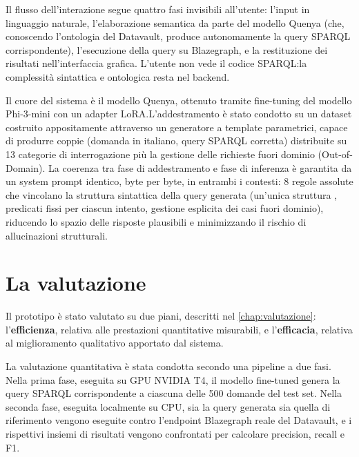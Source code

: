 Il flusso dell'interazione segue quattro fasi invisibili all'utente: l'input in linguaggio naturale, l'elaborazione semantica da parte del modello Quenya (che, conoscendo l'ontologia del Datavault, produce autonomamente la query SPARQL corrispondente), l'esecuzione della query su Blazegraph, e la restituzione dei risultati nell'interfaccia grafica. L'utente non vede il codice SPARQL:\@ la complessità sintattica e ontologica resta nel backend.

Il cuore del sistema è il modello Quenya, ottenuto tramite fine-tuning del modello Phi-3-mini con un adapter LoRA.\@ L'addestramento è stato condotto su un dataset costruito appositamente attraverso un generatore a template parametrici, capace di produrre coppie (domanda in italiano, query SPARQL corretta) distribuite su 13 categorie di interrogazione più la gestione delle richieste fuori dominio (Out-of-Domain). La coerenza tra fase di addestramento e fase di inferenza è garantita da un system prompt identico, byte per byte, in entrambi i contesti: 8 regole assolute che vincolano la struttura sintattica della query generata (un'unica struttura , predicati fissi per ciascun intento, gestione esplicita dei casi fuori dominio), riducendo lo spazio delle risposte plausibili e minimizzando il rischio di allucinazioni strutturali.

\section{La valutazione}\label{sec:valutazione_intro}

Il prototipo è stato valutato su due piani, descritti nel \cref{chap:valutazione}: l'\textbf{efficienza}, relativa alle prestazioni quantitative misurabili, e l'\textbf{efficacia}, relativa al miglioramento qualitativo apportato dal sistema.

La valutazione quantitativa è stata condotta secondo una pipeline a due fasi. Nella prima fase, eseguita su GPU NVIDIA T4, il modello fine-tuned genera la query SPARQL corrispondente a ciascuna delle 500 domande del test set. Nella seconda fase, eseguita localmente su CPU, sia la query generata sia quella di riferimento vengono eseguite contro l'endpoint Blazegraph reale del Datavault, e i rispettivi insiemi di risultati vengono confrontati per calcolare precision, recall e F1.

